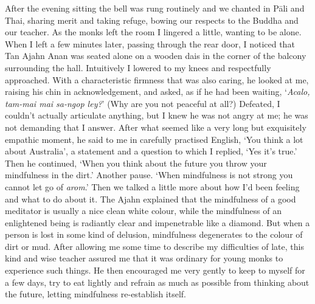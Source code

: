 After the evening sitting the bell was rung routinely and we chanted in
Pāli and Thai, sharing merit and taking refuge, bowing our respects to
the Buddha and our teacher. As the monks left the room I lingered a
little, wanting to be alone. When I left a few minutes later, passing
through the rear door, I noticed that Tan Ajahn Anan was seated alone on
a wooden dais in the corner of the balcony surrounding the hall. 
Intuitively I lowered to my knees and respectfully approached. With a
characteristic firmness that was also caring, he looked at me, raising
his chin in acknowledgement, and asked, as if he had been waiting, 
`\emph{Acalo, tam-mai mai sa-ngop ley?}' (Why are you not peaceful at
all?) Defeated, I couldn't actually articulate anything, but I knew he
was not angry at me; he was not demanding that I answer. After what
seemed like a very long but exquisitely empathic moment, he said to me
in carefully practised English, `You think a lot about Australia', a
statement and a question to which I replied, `Yes it's true.' Then he
continued, `When you think about the future you throw your mindfulness
in the dirt.' Another pause. `When mindfulness is not strong you cannot
let go of \emph{arom}.' Then we talked a little more about how I'd been
feeling and what to do about it. The Ajahn explained that the
mindfulness of a good meditator is usually a nice clean white colour, 
while the mindfulness of an enlightened being is radiantly clear and
impenetrable like a diamond. But when a person is lost in some kind of
delusion, mindfulness degenerates to the colour of dirt or mud. After
allowing me some time to describe my difficulties of late, this kind and
wise teacher assured me that it was ordinary for young monks to
experience such things. He then encouraged me very gently to keep to
myself for a few days, try to eat lightly and refrain as much as
possible from thinking about the future, letting mindfulness
re-establish itself. 

